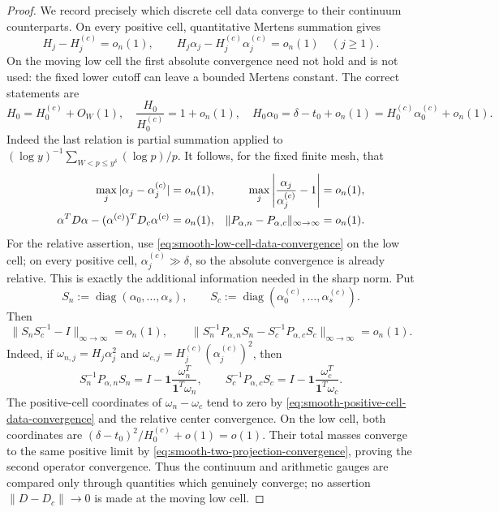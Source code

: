 \documentclass[11pt]{article}
\numberwithin{equation}{section}
\theoremstyle{definition}
\theoremstyle{remark}
\newcommand{\1}{\mathbf 1}
\begin{document}
\begin{proof}
We record precisely which discrete cell data converge to their continuum
counterparts.  On every positive cell, quantitative Mertens summation
gives
\begin{equation}
 H_j-H_j^{(c)}=o_n(1),\qquad
 H_j\alpha_j-H_j^{(c)}\alpha_j^{(c)}=o_n(1)\quad(j\geq1).
 \label{eq:smooth-positive-cell-data-convergence}
\end{equation}
On the moving low cell the first absolute convergence need not hold and is
not used: the fixed lower cutoff can leave a bounded Mertens constant.
The correct statements are
\begin{equation}
 H_0=H_0^{(c)}+O_W(1),\quad
 \frac{H_0}{H_0^{(c)}}=1+o_n(1),\quad
 H_0\alpha_0=\delta-t_0+o_n(1)
                  =H_0^{(c)}\alpha_0^{(c)}+o_n(1).
 \label{eq:smooth-low-cell-data-convergence}
\end{equation}
Indeed the last relation is partial summation applied to
\((\log y)^{-1}\sum_{W<p\leq y^\delta}(\log p)/p\).
It follows, for the fixed finite mesh, that
\begin{align}
 \max_j|\alpha_j-\alpha_j^{(c)}|&=o_n(1),&
 \max_j\left|\frac{\alpha_j}{\alpha_j^{(c)}}-1\right|&=o_n(1),\notag\\
 \alpha^TD\alpha-(\alpha^{(c)})^TD_c\alpha^{(c)}&=o_n(1),&
 \|P_{\alpha,n}-P_{\alpha,c}\|_{\infty\to\infty}&=o_n(1).
 \label{eq:smooth-two-projection-convergence}
\end{align}
For the relative assertion, use
\eqref{eq:smooth-low-cell-data-convergence} on the low cell; on every
positive cell, \(\alpha_j^{(c)}\gg\delta\), so the absolute convergence
is already relative.  This is exactly the additional information needed
in the sharp norm.  Put
\[
 S_n:=\operatorname{diag}(\alpha_0,\ldots,\alpha_s),\qquad
 S_c:=\operatorname{diag}(\alpha_0^{(c)},\ldots,\alpha_s^{(c)}).
\]
Then
\begin{equation}
 \|S_nS_c^{-1}-I\|_{\infty\to\infty}=o_n(1),\qquad
 \|S_n^{-1}P_{\alpha,n}S_n
      -S_c^{-1}P_{\alpha,c}S_c\|_{\infty\to\infty}=o_n(1).
 \label{eq:smooth-sharp-projection-convergence}
\end{equation}
Indeed, if \(\omega_{n,j}=H_j\alpha_j^2\) and
\(\omega_{c,j}=H_j^{(c)}(\alpha_j^{(c)})^2\), then
\[
 S_n^{-1}P_{\alpha,n}S_n
   =I-\mathbf1\frac{\omega_n^T}{\mathbf1^T\omega_n},\qquad
 S_c^{-1}P_{\alpha,c}S_c
   =I-\mathbf1\frac{\omega_c^T}{\mathbf1^T\omega_c}.
\]
The positive-cell coordinates of \(\omega_n-\omega_c\) tend to zero by
\eqref{eq:smooth-positive-cell-data-convergence} and the relative
center convergence.  On the low cell, both coordinates are
\((\delta-t_0)^2/H_0^{(c)}+o(1)=o(1)\).  Their total masses converge to
the same positive limit by
\eqref{eq:smooth-two-projection-convergence}, proving the second operator
convergence.
Thus the continuum and arithmetic gauges are compared only through
quantities which genuinely converge; no assertion
\(\|D-D_c\|\to0\) is made at the moving low cell.


\end{proof}
\end{document}
